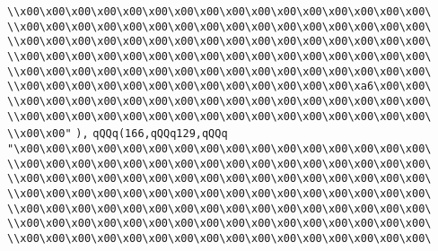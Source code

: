 \verb|\\x00\x00\x00\x00\x00\x00\x00\x00\x00\x00\x00\x00\x00\x00\x00\x00\|\newline
\verb|\\x00\x00\x00\x00\x00\x00\x00\x00\x00\x00\x00\x00\x00\x00\x00\x00\|\newline
\verb|\\x00\x00\x00\x00\x00\x00\x00\x00\x00\x00\x00\x00\x00\x00\x00\x00\|\newline
\verb|\\x00\x00\x00\x00\x00\x00\x00\x00\x00\x00\x00\x00\x00\x00\x00\x00\|\newline
\verb|\\x00\x00\x00\x00\x00\x00\x00\x00\x00\x00\x00\x00\x00\x00\x00\x00\|\newline
\verb|\\x00\x00\x00\x00\x00\x00\x00\x00\x00\x00\x00\x00\x00\xa6\x00\x00\|\newline
\verb|\\x00\x00\x00\x00\x00\x00\x00\x00\x00\x00\x00\x00\x00\x00\x00\x00\|\newline
\verb|\\x00\x00\x00\x00\x00\x00\x00\x00\x00\x00\x00\x00\x00\x00\x00\x00\|\newline
\verb|\\x00\x00"|\newline
\verb|),|\newline
\verb|qQQq(166,qQQq129,qQQq|\newline
\verb|"\x00\x00\x00\x00\x00\x00\x00\x00\x00\x00\x00\x00\x00\x00\x00\x00\|\newline
\verb|\\x00\x00\x00\x00\x00\x00\x00\x00\x00\x00\x00\x00\x00\x00\x00\x00\|\newline
\verb|\\x00\x00\x00\x00\x00\x00\x00\x00\x00\x00\x00\x00\x00\x00\x00\x00\|\newline
\verb|\\x00\x00\x00\x00\x00\x00\x00\x00\x00\x00\x00\x00\x00\x00\x00\x00\|\newline
\verb|\\x00\x00\x00\x00\x00\x00\x00\x00\x00\x00\x00\x00\x00\x00\x00\x00\|\newline
\verb|\\x00\x00\x00\x00\x00\x00\x00\x00\x00\x00\x00\x00\x00\x00\x00\x00\|\newline
\verb|\\x00\x00\x00\x00\x00\x00\x00\x00\x00\x00\x00\x00\x00\x00\x00\x00\|\newline

